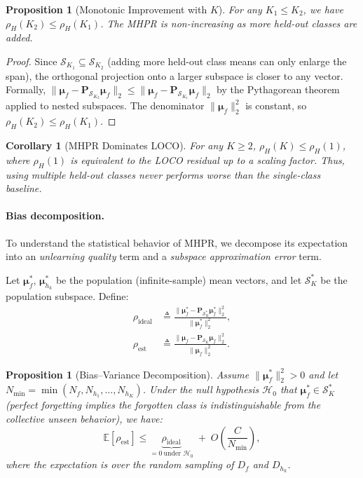 \documentclass[journal]{IEEEtran}
\newtheorem{proposition}[theorem]{Proposition}
\newtheorem{corollary}[theorem]{Corollary}
\theoremstyle{definition}
\newcommand{\coloneqq}{\triangleq}
\begin{document}
\begin{proposition}[Monotonic Improvement with $K$]
\label{prop:mhpr_monotone}
For any $K_1 \le K_2$, we have $\rho_H(K_2) \le \rho_H(K_1)$. The MHPR is non-increasing as more held-out classes are added.
\end{proposition}

\begin{proof}
Since $\mathcal{S}_{K_1} \subseteq \mathcal{S}_{K_2}$ (adding more held-out class means can only enlarge the span), the orthogonal projection onto a larger subspace is closer to any vector. Formally, $\|\boldsymbol{\mu}_f - \mathbf{P}_{\mathcal{S}_{K_2}}\boldsymbol{\mu}_f\|_2 \le \|\boldsymbol{\mu}_f - \mathbf{P}_{\mathcal{S}_{K_1}}\boldsymbol{\mu}_f\|_2$ by the Pythagorean theorem applied to nested subspaces. The denominator $\|\boldsymbol{\mu}_f\|_2^2$ is constant, so $\rho_H(K_2) \le \rho_H(K_1)$.
\end{proof}

\begin{corollary}[MHPR Dominates LOCO]
\label{cor:mhpr_dominates_loco}
For any $K \ge 2$, $\rho_H(K) \le \rho_H(1)$, where $\rho_H(1)$ is equivalent to the LOCO residual up to a scaling factor. Thus, using multiple held-out classes never performs worse than the single-class baseline.
\end{corollary}

\paragraph{Bias decomposition.}
To understand the statistical behavior of MHPR, we decompose its expectation into an \emph{unlearning quality} term and a \emph{subspace approximation error} term.

Let $\boldsymbol{\mu}_f^*$, $\boldsymbol{\mu}_{h_k}^*$ be the population (infinite-sample) mean vectors, and let $\mathcal{S}_K^*$ be the population subspace. Define:
\begin{align}
\rho_{\mathrm{ideal}} &\coloneqq \frac{\|\boldsymbol{\mu}_f^* - \mathbf{P}_{\mathcal{S}_K^*}\boldsymbol{\mu}_f^*\|_2^2}{\|\boldsymbol{\mu}_f^*\|_2^2}, \label{eq:rho_ideal}\\
\rho_{\mathrm{est}} &\coloneqq \frac{\|\boldsymbol{\mu}_f - \mathbf{P}_{\mathcal{S}_K}\boldsymbol{\mu}_f\|_2^2}{\|\boldsymbol{\mu}_f\|_2^2}. \label{eq:rho_est}
\end{align}

\begin{proposition}[Bias--Variance Decomposition]
\label{prop:mhpr_bias}
Assume $\|\boldsymbol{\mu}_f^*\|_2^2 > 0$ and let $N_{\min} = \min(N_f, N_{h_1},\dots,N_{h_K})$. Under the null hypothesis $\mathcal{H}_0$ that $\boldsymbol{\mu}_f^* \in \mathcal{S}_K^*$ (perfect forgetting implies the forgotten class is indistinguishable from the collective unseen behavior), we have:
\begin{equation}
\mathbb{E}[\rho_{\mathrm{est}}] \le \underbrace{\rho_{\mathrm{ideal}}}_{=0\ \text{under }\mathcal{H}_0} \;+\; O\!\left(\frac{C}{N_{\min}}\right),
\label{eq:mhpr_convergence}
\end{equation}
where the expectation is over the random sampling of $D_f$ and $D_{h_k}$.
\end{proposition}
\end{document}
